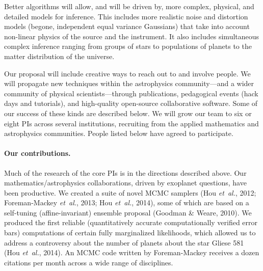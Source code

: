 \documentclass[12pt]{article}
\newcommand{\foreign}[1]{\textsl{#1}}
\newcommand{\etal}{\foreign{et~al.}}
\begin{document}
Better algorithms will allow, and will be driven by, more complex, physical, and
detailed models for inference.
This includes more realistic noise and distortion models (begone, independent 
equal variance Gaussians) that take into account non-linear physics of the source
and the instrument.
It also includes simultaneous complex inference ranging from groups of stars to
populations of planets to the matter distribution of the universe.





%
%

Our proposal will include creative ways to reach out to and involve people.
We will propagate new techniques within the astrophysics community---and a wider
community of physical scientists---through publications, pedagogical
events (hack days and tutorials), and high-quality open-source
collaborative software. 
Some of our success of these kinds are described below.
We will grow our team to six or eight PIs across several institutions, 
recruiting from the applied mathematics and astrophysics communities.
People listed below have agreed to participate.



\paragraph{Our contributions.}

Much of the research of the core PIs is in the directions described above.
Our mathematics/astrophysics collaborations, driven by exoplanet questions,
have been productive.
We created a suite of novel MCMC samplers 
(Hou \etal, 2012; Foreman-Mackey \etal, 2013; Hou \etal,
2014), some of which are based on a self-tuning (affine-invariant)
ensemble proposal (Goodman \& Weare, 2010).
We produced the first reliable (quantitatively accurate computationally 
verified error bars) computations of certain fully
marginalized likelihoods, which allowed us to address a controversy
about the number of planets about the star Gliese 581 (Hou \etal, 2014).
An MCMC code written by Foreman-Mackey receives a dozen
citations per month across a wide range of disciplines.
\end{document}
